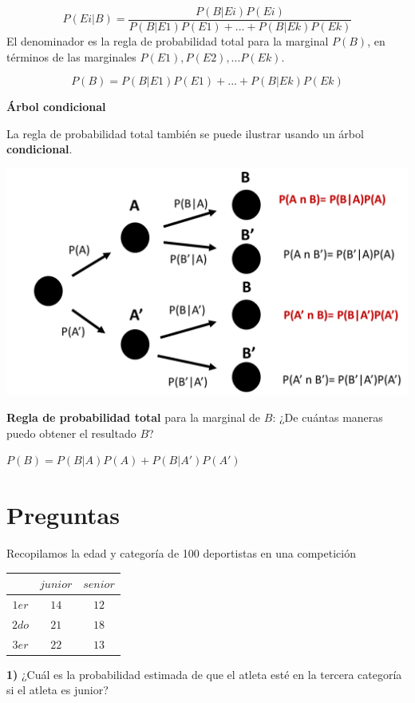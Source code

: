 \documentclass[
]{book}
\begin{document}
\[P(Ei|B)=\frac{P(B|Ei)P(Ei)}{P(B|E1)P(E1) +...+ P(B|Ek)P(Ek)} \]
El denominador es la regla de probabilidad total para la marginal \(P(B)\), en términos de las marginales \(P(E1), P(E2), ... P(Ek)\).

\[P(B)=P(B|E1)P(E1) +...+ P(B|Ek)P(Ek)\]

\textbf{Árbol condicional}

La regla de probabilidad total también se puede ilustrar usando un árbol \textbf{condicional}.

\includegraphics{./figures/treetot.PNG}

\textbf{Regla de probabilidad total} para la marginal de \(B\): ¿De cuántas maneras puedo obtener el resultado \(B\)?

\(P(B)=P(B|A)P(A)+P(B|A')P(A')\)

\hypertarget{preguntas-2}{%
\section{Preguntas}\label{preguntas-2}}

Recopilamos la edad y categoría de 100 deportistas en una competición

\begin{longtable}[]{@{}ccc@{}}
\toprule\noalign{}
& \(junior\) & \(senior\) \\
\midrule\noalign{}
\endhead
\bottomrule\noalign{}
\endlastfoot
\(1er\) & \(14\) & \(12\) \\
\(2do\) & \(21\) & \(18\) \\
\(3er\) & \(22\) & \(13\) \\
\end{longtable}

\textbf{1)} ¿Cuál es la probabilidad estimada de que el atleta esté en la tercera categoría si el atleta es junior?
\end{document}
